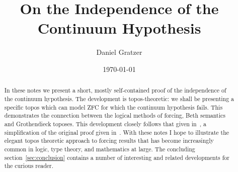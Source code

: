 \documentclass[12pt]{amsart}
\title{On the Independence of the Continuum Hypothesis}
\author{Daniel Gratzer}
\date{\today}
\begin{document}
\begin{abstract}
  In these notes we present a short, mostly self-contained proof of
  the independence of the continuum hypothesis. The development is
  topos-theoretic: we shall be presenting a specific topos which can
  model ZFC for which the continuum hypothesis fails. This
  demonstrates the connection between the logical methods of forcing,
  Beth semantics and Grothendieck toposes. This development closely
  follows that given in~\citet[Chapter~6]{MacLane:92}, a
  simplification of the original proof given in~\citet{Cohen:63}. With
  these notes I hope to illustrate the elegant topos theoretic
  approach to forcing results that has become increasingly common in
  logic, type theory, and mathematics at large. The concluding
  section~\ref{sec:conclusion} contains a number of interesting and
  related developments for the curious reader.
\end{abstract}
\maketitle








{}
\end{document}
